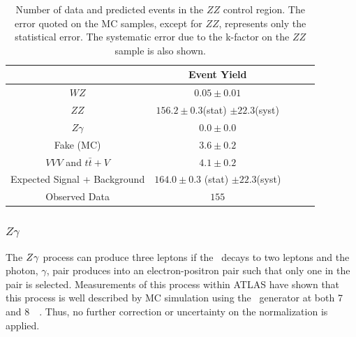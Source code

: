 \begin{table}[htp]
\centering
\begin{tabular}{|c||c|c|c|c|}
\hline
 & Event Yield\\ 
\hline\hline
$WZ$ &  $0.05 \pm 0.01$\\ 
$ZZ$ &  $156.2 \pm 0.3$(stat) $\pm 22.3$(syst) \\ 
$Z\gamma$ &  $0.0 \pm 0.0$\\ 
Fake (MC) &  $3.6 \pm 0.2$\\ 
$VVV$ and $t\bar{t}+V$ &  $4.1 \pm 0.2$\\ 
\hline
Expected Signal + Background &  $164.0 \pm 0.3$ (stat) $\pm 22.3$(syst)\\ 
\hline
Observed Data &  $155$\\ %
\hline
\end{tabular}
\caption{Number of data and predicted events in the $ZZ$ control region. 
The error quoted on the MC samples, except for $ZZ$,
represents only the statistical error. 
The systematic error due to the k-factor on the $ZZ$ sample is also shown.}
\label{tab:ZZ_CR}
\end{table}



\subsubsection{$Z\gamma$}
\label{sec:zgammabg}

The $Z\gamma$ process can produce three leptons 
if the \z~decays to two leptons and the photon, $\gamma$,
pair produces into an electron-positron pair such that only one in the 
pair is selected.
Measurements of this process within ATLAS
have shown that this process is well described by MC simulation
using the \sherpa~generator at both 7 and 8~\TeV~\cite{Aad:2013izg,Auerbach:1631102}.
Thus, no further correction or uncertainty on the normalization is applied.


